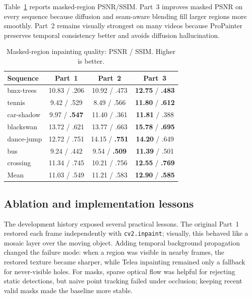 \documentclass[10pt,twocolumn,letterpaper]{article}
\begin{document}
Table~\ref{tab:inpaint} reports masked-region PSNR/SSIM. Part~3 improves masked PSNR on every sequence because diffusion and seam-aware blending fill larger regions more smoothly. Part~2 remains visually strongest on many videos because ProPainter preserves temporal consistency better and avoids diffusion hallucination.

\begin{table}[t]
  \centering
  \scriptsize
  \caption{Masked-region inpainting quality: PSNR / SSIM. Higher is better.}
  \label{tab:inpaint}
  \begin{tabular}{lccc}
    \toprule
    Sequence & Part~1 & Part~2 & Part~3 \\
    \midrule
    bmx-trees & 10.83 / .206 & 10.92 / .473 & \textbf{12.75} / \textbf{.483} \\
    tennis & 9.42 / .529 & 8.49 / .566 & \textbf{11.80} / \textbf{.612} \\
    car-shadow & 9.97 / \textbf{.547} & 11.40 / .361 & \textbf{11.81} / .388 \\
    blackswan & 13.72 / .621 & 13.77 / .663 & \textbf{15.78} / \textbf{.695} \\
    dance-jump & 12.72 / .751 & 14.15 / \textbf{.751} & \textbf{14.20} / .649 \\
    bus & 9.24 / .442 & 9.54 / \textbf{.509} & \textbf{11.39} / .501 \\
    crossing & 11.34 / .745 & 10.21 / .756 & \textbf{12.55} / \textbf{.769} \\
    \midrule
    Mean & 11.03 / .549 & 11.21 / .583 & \textbf{12.90} / \textbf{.585} \\
    \bottomrule
  \end{tabular}
\end{table}

\subsection{Ablation and implementation lessons}
The development history exposed several practical lessons. The original Part~1 restored each frame independently with \texttt{cv2.inpaint}; visually, this behaved like a mosaic layer over the moving object. Adding temporal background propagation changed the failure mode: when a region was visible in nearby frames, the restored texture became sharper, while Telea inpainting remained only a fallback for never-visible holes. For masks, sparse optical flow was helpful for rejecting static detections, but naive point tracking failed under occlusion; keeping recent valid masks made the baseline more stable.
\end{document}
